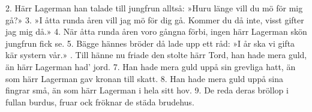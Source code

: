\setlength{\columnsep}{0.1cm}
\begin{multicols}{2}
2.  Härr Lagerman han talade till jungfrun alltså:
    »Huru länge vill du mö för mig gå?»
3.  »I åtta runda åren vill jag mö för dig gå.
    Kommer du då inte, visst gifter jag mig då.»
4.  När åtta runda åren voro gångna förbi,
    ingen härr Lagerman skön jungfrun fick se.
5.  Bägge hännes bröder då lade upp ett råd:
    »I år ska vi gifta kär systern vår.»
\vfill{}.  Till hänne nu friade den stolte härr Tord,
    han hade mera guld, än härr Lagerman had’ jord.
7.  Han hade mera guld uppå sin grevliga hatt,
    än som härr Lagerman gav kronan till skatt.
8.  Han hade mera guld uppå sina fingrar små,
    än som härr Lagerman i hela sitt hov.
9.  De reda deras bröllop i fullan burdus,
    fruar ock fröknar de städa brudehus.
\end{multicols}
